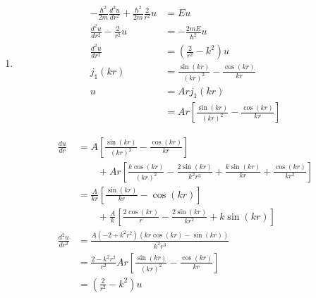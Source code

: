 \documentclass{article}
\begin{document}
\begin{enumerate}
  \item

        \begin{align*}
          -\frac{\hbar^2}{2 m} \frac{d^2 u}{d r^2} + \frac{\hbar^2}{2 m} \frac{2}{r^2} u & = E u                                                                    \\
          \frac{d^2 u}{d r^2} - \frac{2}{r^2} u                                          & = -\frac{2 m E}{\hbar^2} u                                               \\
          \frac{d^2 u}{d r^2}                                                            & = \left( \frac{2}{r^2} - k^2 \right) u                                   \\
          j_1(k r)                                                                       & = \frac{\sin (k r)}{(k r)^2} - \frac{\cos (k r)}{k r}                    \\
          u                                                                              & = A r j_1(k r)                                                           \\
                                                                                         & = A r \left[ \frac{\sin (k r)}{(k r)^2} - \frac{\cos (k r)}{k r} \right]
        \end{align*}

        \begin{align*}
          \frac{d u}{d r}     & = A \left[ \frac{\sin (k r)}{(k r)^2} - \frac{\cos (k r)}{k r} \right]                                                                        \\
                              & \qquad + A r \left[ \frac{k \cos (k r)}{(k r)^2} - \frac{2 \sin (k r)}{k^2 r^3} + \frac{k \sin (k r)}{k r} + \frac{\cos (k r)}{k r^2} \right] \\
                              & = \frac{A}{k r} \left[ \frac{\sin (k r)}{k r} - \cos (k r) \right]                                                                            \\
                              & \qquad + \frac{A}{k} \left[ \frac{2 \cos (k r)}{r} - \frac{2 \sin (k r)}{k r^2} + k \sin (k r) \right]                                        \\
          \frac{d^2 u}{d r^2} & = \frac{A (-2 + k^2 r^2) (k r \cos (k r) - \sin (k r))}{k^2 r^3}                                                                              \\
                              & = \frac{2 - k^2 r^2}{r^2} A r \left[ \frac{\sin (k r)}{(k r)^2} - \frac{\cos (k r)}{k r} \right]                                              \\
                              & = \left( \frac{2}{r^2} - k^2 \right) u
        \end{align*}


\end{enumerate}
\end{document}
